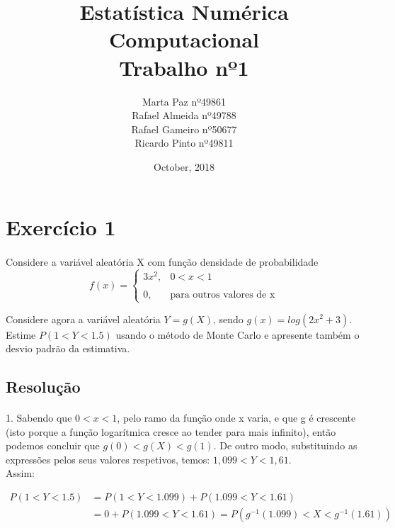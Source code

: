 \documentclass{article}
\title{Estatística Numérica Computacional\\Trabalho nº1}
\author{Marta Paz nº49861\\
		Rafael Almeida nº49788\\
		Rafael Gameiro nº50677\\
		Ricardo Pinto nº49811\\
}
\date{October, 2018}
\begin{document}
	\maketitle
	\newpage
	
	
	\section*{Exercício 1}
		\paragraph{}
			Considere a variável aleatória X com função densidade de probabilidade
			\begin{equation*}
				f(x) = \begin{cases} 
						3x^2, & 0 < x < 1 \\\\ 0, & \mbox{para outros valores de x} 
					\end{cases}
			\end{equation*}
	
			Considere agora a variável aleatória $Y = g(X)$, sendo $g(x) = log(2x^2 + 3)$. Estime $P(1 < Y < 1.5)$ usando o método de Monte Carlo e apresente também o desvio padrão da estimativa.
	
		\subsection*{Resolução}
			\paragraph{}
				1. Sabendo que $0 < x < 1$, pelo ramo da função onde x varia, e que g é crescente (isto porque a função logarítmica cresce ao tender para mais infinito), então podemos concluir que $g(0) < g(X) < g(1)$.
De outro modo, substituindo as expressões pelos seus valores respetivos, temos: $1,099 < Y < 1,61$.\\
				Assim:
				
					\begin{align*}	
				 P(1 < Y < 1.5) &= P(1 < Y < 1.099) + P(1.099 < Y < 1.61)\\ 
				 &= 0 + P(1.099 < Y < 1.61) = P(g^{-1}(1.099) < X < g^{-1}(1.61))
				 	\end{align*}
\end{document}
